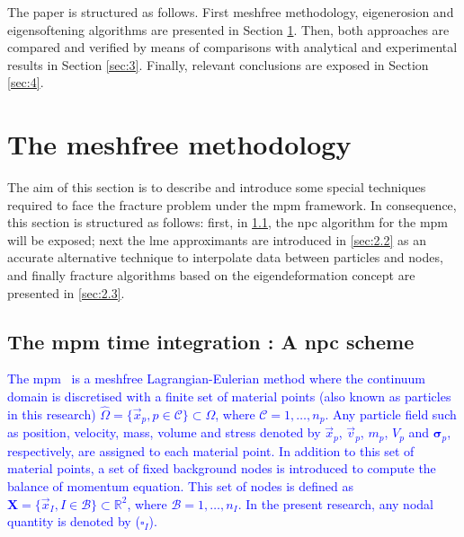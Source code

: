 \documentclass[preprint,12pt,a4paper]{elsarticle}
\newcommand{\tens}[1]{
  \ensuremath{\mathbf{{#1}}}
}
\begin{document}
The paper is structured as follows. First meshfree methodology,
eigenerosion and eigensoftening algorithms are presented in Section
\ref{sec:2}. Then, both approaches are compared and verified by means of
comparisons with analytical and experimental results in Section
\ref{sec:3}. Finally, relevant conclusions are exposed in Section \ref{sec:4}.

\section{The meshfree methodology}
\label{sec:2}

The aim of this section is to describe and introduce some special
techniques required to face the fracture problem under the \acrshort{mpm}
framework. In consequence, this section is structured as follows: first, in
\ref{sec:2.1}, the \acrfull{npc} algorithm for the \acrshort{mpm}
will be exposed; next the \acrshort{lme} approximants are
introduced in \ref{sec:2.2} as an accurate alternative technique to
interpolate data between particles and nodes, and finally fracture
algorithms based on the eigendeformation concept are presented in
\ref{sec:2.3}.

\subsection{The \acrshort{mpm} time integration : A \acrlong{npc}  scheme}
\label{sec:2.1}

\textcolor{blue}{The \acrshort{mpm}~\cite{Sulsky1994} is a meshfree Lagrangian-Eulerian method where the continuum \gls{domain} is discretised with a finite set of material points (also known as particles in this research) $\hat{\Omega} = \{ \vec{x}_p, p \in \mathcal{C} \} \subset \Omega$, where $\mathcal{C} = 1, \ldots, n_p$. Any particle field such as position, velocity, mass, volume and stress denoted by $\vec{x}_p$, $\vec{v}_p$, $m_p$, $V_p$ and $\tens{\sigma}_p$, respectively, are assigned to each material point.  In addition to this set of material points, a set of fixed background nodes is introduced to compute the balance of momentum equation. This set of nodes is defined as  $\textbf{X} = \{ \vec{x}_I, I \in \mathcal{B} \} \subset \mathbb{R}^{2}$, where $\mathcal{B} = 1, \ldots, n_I$. In the present research, any nodal quantity is denoted by ($\square_I$).}
\end{document}
